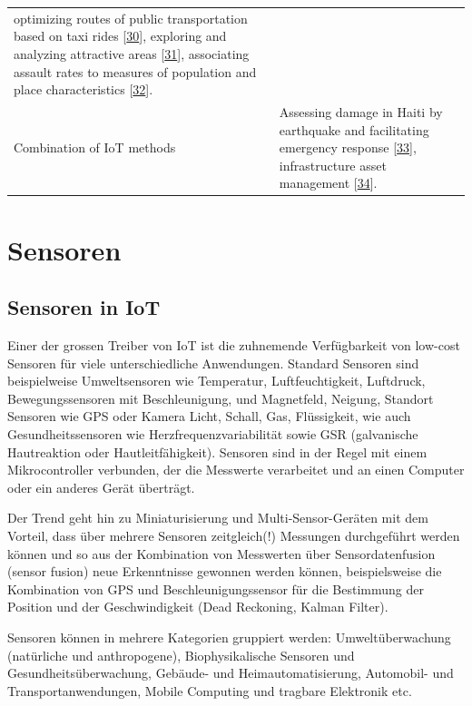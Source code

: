 \documentclass[
  11pt,
  a4paper,
  oneside, openany  ,captions=tableheading
]{scrbook}
\theoremstyle{remark}
\begin{document}
\begin{longtable}[]{@{}
  >{\raggedright\arraybackslash}p{}
  >{\raggedright\arraybackslash}p{}@{}}
optimizing routes of public transportation based on taxi rides
{[}\href{https://www.mdpi.com/2220-9964/7/7/269\#B43-ijgi-07-00269}{30}{]},
exploring and analyzing attractive areas
{[}\href{https://www.mdpi.com/2220-9964/7/7/269\#B38-ijgi-07-00269}{31}{]},
associating assault rates to measures of population and place
characteristics
{[}\href{https://www.mdpi.com/2220-9964/7/7/269\#B41-ijgi-07-00269}{32}{]}. \\
Combination of IoT methods & Assessing damage in Haiti by earthquake and
facilitating emergency response
{[}\href{https://www.mdpi.com/2220-9964/7/7/269\#B61-ijgi-07-00269}{33}{]},
infrastructure asset management
{[}\href{https://www.mdpi.com/2220-9964/7/7/269\#B58-ijgi-07-00269}{34}{]}. \\
\end{longtable}

\chapter{Sensoren}\label{sensoren}

\section{Sensoren in IoT}\label{sensoren-in-iot}

Einer der grossen Treiber von IoT ist die zuhnemende Verfügbarkeit von
low-cost Sensoren für viele unterschiedliche Anwendungen. Standard
Sensoren sind beispielweise Umweltsensoren wie Temperatur,
Luftfeuchtigkeit, Luftdruck, Bewegungssensoren mit Beschleunigung, und
Magnetfeld, Neigung, Standort Sensoren wie GPS oder Kamera Licht,
Schall, Gas, Flüssigkeit, wie auch Gesundheitssensoren wie
Herzfrequenzvariabilität sowie GSR (galvanische Hautreaktion oder
Hautleitfähigkeit). Sensoren sind in der Regel mit einem Mikrocontroller
verbunden, der die Messwerte verarbeitet und an einen Computer oder ein
anderes Gerät überträgt.

Der Trend geht hin zu Miniaturisierung und Multi-Sensor-Geräten mit dem
Vorteil, dass über mehrere Sensoren zeitgleich(!) Messungen durchgeführt
werden können und so aus der Kombination von Messwerten über
Sensordatenfusion (sensor fusion) neue Erkenntnisse
gewonnen werden können, beispielsweise die Kombination von GPS und
Beschleunigungssensor für die Bestimmung der Position und der
Geschwindigkeit (Dead Reckoning, Kalman Filter).

Sensoren können in mehrere Kategorien gruppiert werden:
Umweltüberwachung (natürliche und anthropogene), Biophysikalische
Sensoren und Gesundheitsüberwachung, Gebäude- und Heimautomatisierung,
Automobil- und Transportanwendungen, Mobile Computing und tragbare
Elektronik etc.
\end{document}
